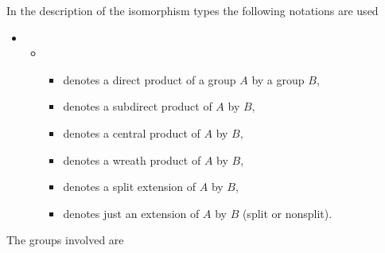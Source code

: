 In  the description of the isomorphism  types the following notations are
used\:
\vspace{-2mm}
\begin{itemize}
\item[]
\begin{itemize}
\item[]
\begin{itemize}
\item[{\makebox[15mm][l]{$A\,\mbox{x}\,B$}}]  denotes a direct product of
      a group $A$ by a group $B$, \vspace{-1mm}
\item[{\makebox[15mm][l]{$A\,\mbox{subd}\,B$}}]   denotes   a   subdirect
      product of $A$ by $B$, \vspace{-1mm}
\item[{\makebox[15mm][l]{$A\,\mbox{Y}\,B$}}] denotes a central product of
      $A$ by $B$, \vspace{-1mm}
\item[{\makebox[15mm][l]{$A\,\mbox{wr}\,B$}}] denotes a wreath product of
      $A$ by $B$, \vspace{-1mm}
\item[{\makebox[15mm][l]{$A\:B$}}]  denotes  a split extension  of $A$ by
      $B$, \vspace{-1mm}
\item[{\makebox[15mm][l]{$A\,.\,B$}}] denotes just an extension of $A$ by
      $B$ (split or nonsplit). \vspace{-2mm}
\end{itemize}
\end{itemize}
\end{itemize}
The groups involved are
\vspace{-3mm}

